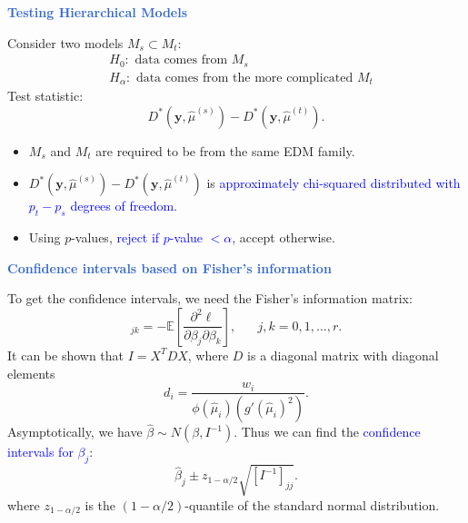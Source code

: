 \documentclass[aspectratio=169,professionalfonts,mathserif]{beamer}
\newcommand{\highlight}[1]{\textcolor{Highlight}{\bf #1}}
\renewcommand{\(}{\left(}
\renewcommand{\)}{\right)}
\renewcommand{\[}{\left[}
\renewcommand{\]}{\right]}
\newcommand{\mytitle}[1]{\vspace*{-1mm}%
  \centerline{\highlight{\Large #1}}\vspace*{3mm}}
\newenvironment{slidebox}{%
  \begin{minipage}[c][7.5cm][t]{14.4cm}\raggedright}{%
  \end{minipage}}
\begin{document}
\begin{frame}\begin{slidebox}
  \mytitle{Testing Hierarchical Models}
  Consider two models $M_s \subset M_t$:
  \begin{align*}
    & H_0: \text{ data comes from } M_s \\
    & H_\alpha: \text{ data comes from the more complicated } M_t 
  \end{align*}
  \pause
  Test statistic:
  \begin{equation*}
    D^*(\mathbf{y}, \hat{\mu}^{(s)}) - D^*(\mathbf{y}, \hat{\mu}^{(t)}) \text{.}
  \end{equation*}
  \pause
  \begin{itemize}
    \item   $M_s$ and $M_t$ are required to be from the same EDM family.
    \pause
    \item   $D^*(\mathbf{y}, \hat{\mu}^{(s)}) - D^*(\mathbf{y}, \hat{\mu}^{(t)})$ is \textcolor{blue}{approximately chi-squared distributed with $p_t - p_s$ degrees of freedom}.
    \pause
    \item   Using $p$-values, \textcolor{blue}{reject if $p$-value $< \alpha$}, accept otherwise.
  \end{itemize}
\end{slidebox}\end{frame}

\begin{frame}\begin{slidebox}
  \mytitle{Confidence intervals based on Fisher’s information}
  To get the confidence intervals, we need the Fisher's information matrix:
  \begin{equation*}
    [I]_{jk} = - \mathbb{E} \left[ \frac{\partial^2 \ell}{\partial \beta_j \partial \beta_k} \right], \;\;\;\;\;\; j,k = 0,1, \dots, r \text{.}
  \end{equation*}
  \pause
  It can be shown that $I = X^T D X$, where $D$ is a diagonal matrix with diagonal elements
  \begin{equation*}
    d_i = \frac{w_i}{\phi(\hat{\mu}_i)(g'(\hat{\mu}_i)^2)}  \text{.}
  \end{equation*}
  \pause
  Asymptotically, we have $\hat{\beta} \sim N(\beta, I^{-1})$. 
  Thus we can find the \textcolor{blue}{confidence intervals for $\beta_j$}:
  \begin{equation*}
    \hat{\beta}_j \pm z_{1-\alpha/2} \sqrt{[I^{-1}]_{jj}} \text{.}
  \end{equation*}
  where $z_{1-\alpha/2}$ is the $(1-\alpha/2)$-quantile of the standard normal distribution.
\end{slidebox}\end{frame}
\end{document}
